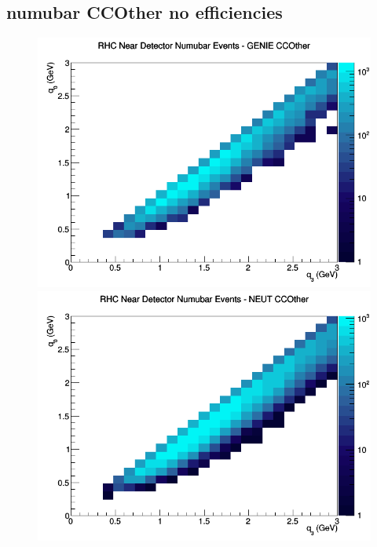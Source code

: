 \documentclass[12pt]{article}
\begin{document}
\subsection{numubar CCOther no efficiencies}
\begin{figure}[h]
\includegraphics[width=\linewidth]{q0_q3/nominal/CCOther_RHC_ND_numubar_q3_q0_GENIE.png}
\endminipage
{}
\includegraphics[width=\linewidth]{q0_q3/nominal/CCOther_RHC_ND_numubar_q3_q0_NEUT.png}
\endminipage
{}

\end{figure}
\end{document}
